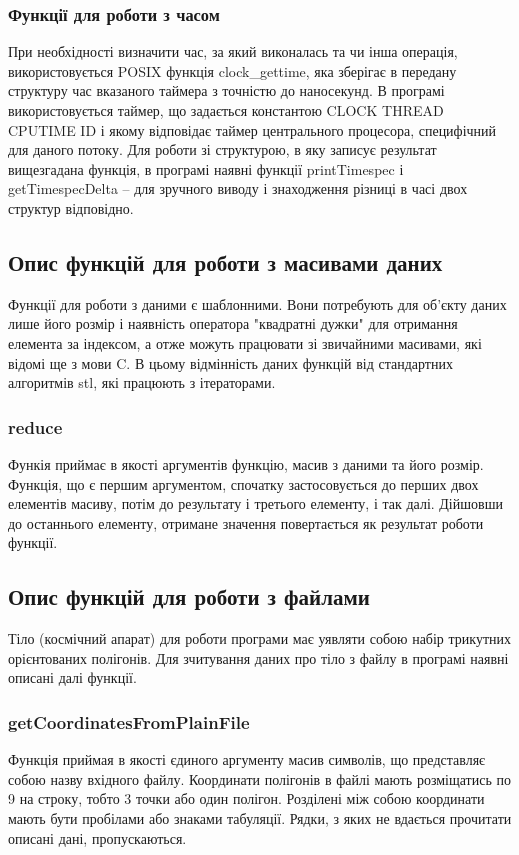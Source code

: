 \documentclass[a4paper,12pt]{article}
\begin{document}
\subsubsection{Функції для роботи з часом}
При необхідності визначити час, за який виконалась та чи інша операція, використовується POSIX функція clock\_gettime, яка зберігає в передану структуру час вказаного таймера з точністю до наносекунд. В програмі використовується таймер, що задається константою CLOCK THREAD CPUTIME ID і якому відповідає таймер центрального процесора, специфічний для даного потоку. Для роботи зі структурою, в яку записує результат вищезгадана функція, в програмі наявні функції printTimespec і getTimespecDelta -- для зручного виводу і знаходження різниці в часі двох структур відповідно.

\subsection{Опис функцій для роботи з масивами даних}
Функції для роботи з даними є шаблонними. Вони потребують для об’єкту даних лише його розмір і наявність оператора "квадратні дужки" для отримання елемента за індексом, а отже можуть працювати зі звичайними масивами, які відомі ще з мови C. В цьому відмінність даних функцій від стандартних алгоритмів stl, які працюють з ітераторами.

\subsubsection{reduce}
Функія приймає в якості аргументів функцію, масив з даними та його розмір. Функція, що є першим аргументом, спочатку застосовується до перших двох елементів масиву, потім до результату і третього елементу, і так далі. Дійшовши до останнього елементу, отримане значення повертається як результат роботи функції.

\subsection{Опис функцій для роботи з файлами} \label{sec:file}
Тіло (космічний апарат) для роботи програми має уявляти собою набір трикутних орієнтованих полігонів. Для зчитування даних про тіло з файлу в програмі наявні описані далі функції.

\subsubsection{getCoordinatesFromPlainFile}
Функція приймая в якості єдиного аргументу масив символів, що представляє собою назву вхідного файлу. Координати полігонів в файлі мають розміщатись по 9 на строку, тобто 3 точки або один полігон. Розділені між собою координати мають бути пробілами або знаками табуляції. Рядки, з яких не вдається прочитати описані дані, пропускаються.
\end{document}
